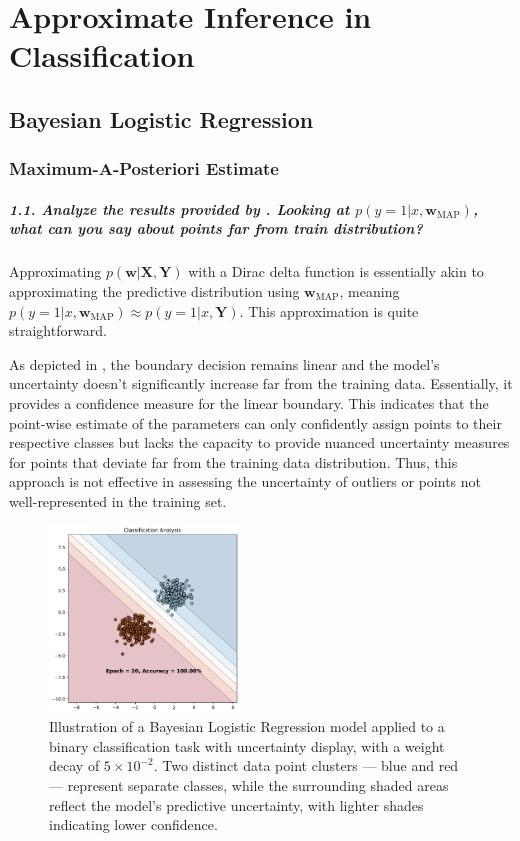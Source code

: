 \graphicspath{{figs/3b}}

\chapter{Approximate Inference in Classification}
\section{Bayesian Logistic Regression}
\subsection{Maximum-A-Posteriori Estimate}
\paragraph{1.1. Analyze the results provided by . Looking at $p(y=1 | x, \mathbf{w}_{\textrm{MAP}})$, what can you say about points far from train distribution?}

Approximating $p(\mathbf{w} | \mathbf{X}, \mathbf{Y})$ with a Dirac delta function is essentially akin to approximating the predictive distribution using $\mathbf{w}_{\textrm{MAP}}$, meaning $p(y=1 | x, \mathbf{w}_{\textrm{MAP}}) \approx p(y=1 | x, \mathbf{Y})$. This approximation is quite straightforward. 

As depicted in , the boundary decision remains linear and the model's uncertainty doesn't significantly increase far from the training data. Essentially, it provides a confidence measure for the linear boundary. This indicates that the point-wise estimate of the parameters can only confidently assign points to their respective classes but lacks the capacity to provide nuanced uncertainty measures for points that deviate far from the training data distribution. Thus, this approach is not effective in assessing the uncertainty of outliers or points not well-represented in the training set.

\begin{figure}[H]
    \centering
    \includegraphics[width=0.45\textwidth]{logreg_map.pdf}
    \caption{Illustration of a Bayesian Logistic Regression model applied to a binary classification task with uncertainty display, with a weight decay of $5 \times 10^{-2}$. Two distinct data point clusters — blue and red — represent separate classes, while the surrounding shaded areas reflect the model's predictive uncertainty, with lighter shades indicating lower confidence.}
    \label{fig:logreg_map}
\end{figure}

